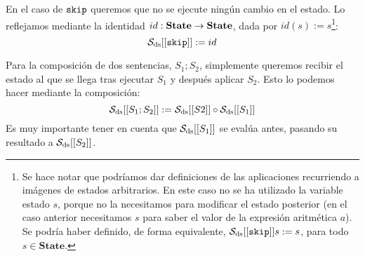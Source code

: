 En el caso de $\texttt{skip}$ queremos que no se ejecute ningún cambio en el estado. Lo reflejamos mediante la identidad $id : \textbf{State} \to \textbf{State}$, dada por $id(s) := s$\footnote{Se hace notar que podríamos dar definiciones de las aplicaciones recurriendo a imágenes de estados arbitrarios. En este caso no se ha utilizado la variable estado $s$, porque no la necesitamos para modificar el estado posterior (en el caso anterior necesitamos $s$ para saber el valor de la expresión aritmética $a$). Se podría haber definido, de forma equivalente, $\mathcal{S}_{\mathrm{ds}} [[\texttt{skip}]]s := s$, para todo $s \in \mathbf{State}$.}:
\[
    \mathcal{S}_{\mathrm{ds}} [[\texttt{skip}]] := id
\]

Para la composición de dos sentencias, $S_1; S_2$, simplemente queremos recibir el estado al que se llega tras ejecutar $S_1$ y después aplicar $S_2$. Esto lo podemos hacer mediante la composición:
\[
    \mathcal{S}_{\mathrm{ds}} [[S_1;S_2]] := \mathcal{S}_{\mathrm{ds}} [[S2]] \circ \mathcal{S}_{\mathrm{ds}} [[S_1]]
\]
Es muy importante tener en cuenta que $\mathcal{S}_{\mathrm{ds}} [[S_1]]$ se evalúa antes, pasando su resultado a $\mathcal{S}_{\mathrm{ds}} [[S_2]]$. 
\\

